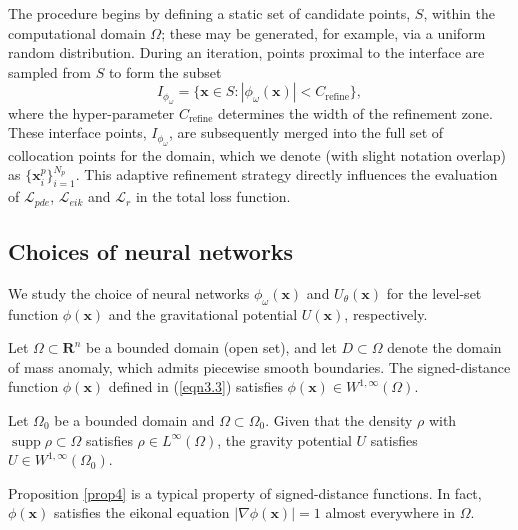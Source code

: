 \documentclass[final,hidelinks,onefignum,onetabnum]{siamart251216}
\begin{document}
The procedure begins by defining a static set of candidate points, $S$, within the computational domain $\Omega$; these may be generated, for example, via a uniform random distribution. During an iteration, points proximal to the interface are sampled from $S$ to form the subset
\begin{equation}
I_{\phi_\omega}=\{\mathbf{x}\in S: |\phi_\omega(\mathbf{x})|<C_{\mathrm{refine}}\},
\end{equation} 
where the hyper-parameter $C_{\mathrm{refine}}$ determines the width of the refinement zone. These interface points, $I_{\phi_\omega}$, are subsequently merged into the full set of collocation points for the domain, which we denote (with slight notation overlap) as $\big\{\mathbf{x}_i^p\big\}_{i=1}^{N_p}$. This adaptive refinement strategy directly influences the evaluation of $\mathcal{L}_{pde}$, $\mathcal{L}_{eik}$ and $\mathcal{L}_r$ in the total loss function.

\subsection{Choices of neural networks}
We study the choice of neural networks $\phi_\omega(\mathbf{x})$ and $U_\theta(\mathbf{x})$ for the level-set function $\phi(\mathbf{x})$ and the gravitational potential $U(\mathbf{x})$, respectively.
\begin{proposition} \label{prop4}
Let $\Omega\subset\mathbf{R}^n$ be a bounded domain (open set), and let $D\subset\Omega$ denote the domain of mass anomaly, which admits piecewise smooth boundaries. The signed-distance function $\phi(\mathbf{x})$ defined in (\ref{eqn3.3}) satisfies $\phi(\mathbf{x})\in W^{1,\infty}(\Omega)$.
\end{proposition}
\begin{proposition} \label{prop5}
Let $\Omega_0$ be a bounded domain and $\Omega\subset\Omega_0$. Given that the density $\rho$ with $\operatorname{supp}\rho\subset\Omega$ satisfies $\rho\in L^\infty(\Omega)$, the gravity potential $U$ satisfies $U\in W^{1,\infty}(\Omega_0)$.
\end{proposition}

Proposition \ref{prop4} is a typical property of signed-distance functions. In fact, $\phi(\mathbf{x})$ satisfies the eikonal equation $|\nabla\phi(\mathbf{x})|=1$ almost everywhere in $\Omega$. 
\end{document}

